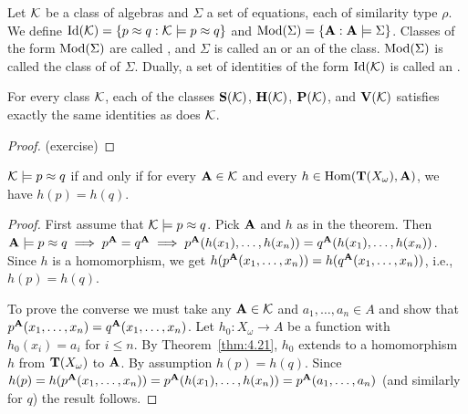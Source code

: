 \begin{definition} Let $\mathcal{K}$ be a class of algebras and $\Sigma$ a set of equations, each 
of similarity type $\rho$. We define 
$\operatorname{Id}(\mathcal{K}) = \{p \approx q : \mathcal{K} \models p \approx q\}$ 
and
$\operatorname{Mod}(\Sigma) = \{ \mathbf{A} : \mathbf{A} \models \Sigma \}$.
Classes of the form $\operatorname{Mod}(\Sigma)$ are called , and $\Sigma$ is called 
an  or an  of the class. $\operatorname{Mod}(\Sigma)$ is called the 
class of  of $\Sigma$. Dually, a set of identities of the form $\operatorname{Id}(\mathcal{K})$ is called an 
.
\end{definition}

\begin{lemma} 
  \label{lem:4.36} 
  For every class $\mathcal{K}$, each of the classes $\mathbf{S}(\mathcal{K})$, 
  $\mathbf{H}(\mathcal{K})$, $\mathbf{P}(\mathcal{K})$, and $\mathbf{V}(\mathcal{K})$ satisfies 
  exactly the same identities as does $\mathcal{K}$.
\end{lemma}
\begin{proof} (exercise) \end{proof}


\begin{lemma}
  \label{lem:4.37} 
  $\mathcal{K} \models p \approx q$ 
  if  and  only  if  for  every  $\mathbf{A} \in \mathcal{K}$  and  every  
  $h\in \operatorname{Hom}(\mathbf{T}(X_\omega),\mathbf{A})$,  we  have  $h(p)  =  h(q)$.
\end{lemma} 
\begin{proof} First  assume  that  $\mathcal{K} \models p\approx  q$.  
  Pick  $\mathbf{A}$ and $h$ as  in  the  theorem.  Then
  $\mathbf{A} \models p\approx q \implies p^{\mathbf{A}} = q^{\mathbf{A}} \implies 
  p^{\mathbf{A}}(h(x_1), \dots, h(x_n)) = q^{\mathbf{A}}(h(x_1), \dots, h(x_n))$.
  Since  $h$  is  a  homomorphism,  we  get  
  $h(p^{\mathbf{A}}(x_1, \dots, x_n)) = h(q^{\mathbf{A}}(x_1, \dots, x_n))$, i.e., $h(p) = h(q)$.

  To  prove  the  converse  we  must  take  any  $\mathbf{A} \in \mathcal{K}$  and  
  $a_1, \dots, a_n \in A$ and show that $p^{\mathbf{A}}(x_1, \dots, x_n) = q^{\mathbf{A}}(x_1, \dots, x_n)$.
  Let $h_0 \colon X_\omega \to A$ be a function with $h_0(x_i) = a_i$ for $i\leq n$.
  By  Theorem~\ref{thm:4.21},  $h_0$ extends  to  a homomorphism  $h$ from $\mathbf{T}(X_\omega)$
  to $\mathbf{A}$.  By  assumption  $h(p)  =  h(q)$.  Since 
  $h(p)  =  h(p^{\mathbf{A}}(x_1, \dots, x_n)) = 
  p^{\mathbf{A}}(h(x_1), \dots, h(x_n)) =  p^{\mathbf{A}}(a_1,\dots, a_n)$ 
  (and  similarly  for  $q$)  the  result  follows. 
\end{proof}




